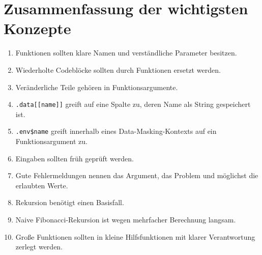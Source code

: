 \documentclass[11pt,a4paper]{ctexart}
\begin{document}
\section{Zusammenfassung der wichtigsten Konzepte}

\begin{enumerate}
  \item Funktionen sollten klare Namen und verständliche Parameter besitzen.
  \item Wiederholte Codeblöcke sollten durch Funktionen ersetzt werden.
  \item Veränderliche Teile gehören in Funktionsargumente.
  \item \texttt{.data[[name]]} greift auf eine Spalte zu, deren Name als
  String gespeichert ist.
  \item \texttt{.env\$name} greift innerhalb eines Data-Masking-Kontexts
  auf ein Funktionsargument zu.
  \item Eingaben sollten früh geprüft werden.
  \item Gute Fehlermeldungen nennen das Argument, das Problem und möglichst
  die erlaubten Werte.
  \item Rekursion benötigt einen Basisfall.
  \item Naive Fibonacci-Rekursion ist wegen mehrfacher Berechnung langsam.
  \item Große Funktionen sollten in kleine Hilfsfunktionen mit klarer
  Verantwortung zerlegt werden.
\end{enumerate}
\end{document}
